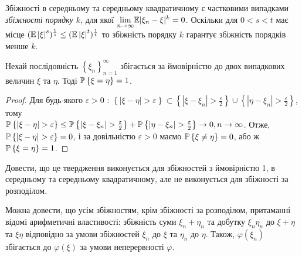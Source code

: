 \begin{remark}
    Збіжності в середньому та середньому квадратичному є частковими випадками \emph{збіжності порядку $k$}, для якої
$\underset{n \to \infty}{\lim} \E|\xi_n - \xi|^k = 0$. Оскільки 
для $0 < s < t$ має місце
$( \E \left| \xi\right|^s)^{\frac{1}{s}} \leq ( \E \left| \xi\right|^t)^{\frac{1}{t}}$
то збіжність порядку $k$ гарантує збіжність порядків менше $k$.
\end{remark}
\begin{proposition*}
     Нехай послідовність $\left\{ \xi_n\right\}_{n=1}^{\infty}$ збігається за ймовірністю до двох випадкових
    величин $\xi$ та $\eta$. Тоді $\P\left\{ \xi = \eta\right\} = 1$.
\end{proposition*}
\begin{proof}
    Для будь-якого $\varepsilon > 0$ : $\left\{ |\xi - \eta| > \varepsilon\right\} \subset 
    \left\{ |\xi - \xi_n| > \frac{\varepsilon}{2}\right\} \cup \left\{ |\eta - \xi_n| > \frac{\varepsilon}{2}\right\}$, тому \\
    $\P\left\{ |\xi - \eta| > \varepsilon\right\} \leq \P\left\{ |\xi - \xi_n| > \frac{\varepsilon}{2}\right\} + 
    \P\left\{ |\eta - \xi_n| > \frac{\varepsilon}{2}\right\} \to 0, n\to\infty$.
    Отже, $\P\left\{ |\xi - \eta| > \varepsilon\right\} = 0$, і за довільністю $\varepsilon > 0$ маємо $\P\left\{ \xi \neq \eta\right\} = 0$,
    або ж $\P\left\{ \xi = \eta\right\} = 1$.
\end{proof}
\begin{exercise}
    Довести, що це твердження виконується для збіжностей з ймовірністю 1, в середньому та середньому квадратичному, але не виконується
    для збіжності за розподілом.
\end{exercise}
Можна довести, що усім збіжностям, крім збіжності за розподілом, притаманні відомі арифметичні властивості: збіжність суми $\xi_n + \eta_n$ та добутку
$\xi_n \eta_n$ до $\xi + \eta$ та $\xi \eta$ відповідно за умови збіжностей $\xi_n$ до $\xi$ та $\eta_n$ до $\eta$. Також, $\varphi(\xi_n)$ збігається
до $\varphi(\xi)$ за умови неперервності $\varphi$.

